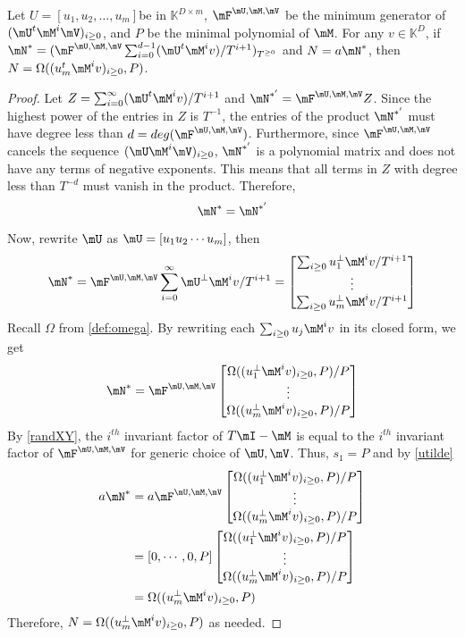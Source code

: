 \documentclass[12pt]{article}
\def\K{\mathbb{K}}
\def\K {\ensuremath{\mathbb{K}}}
\begin{document}
\begin{theorem}
	 Let $U = [u_1,u_2,\dots,u_m]$be in $\K^{D\times m}$,
	 $\mF^{\mU,\mM,\mV}$ be the minimum generator of $(\mU^t \mM^i \mV)_{i\ge0}$,
	 and $P$ be the minimal polynomial of $\mM$. For any 
	 $v \in \K^{D}$, if\\ 
	 $\mN^* = (\mF^{\mU,\mM,\mV}\sum_{i=0}^{d-1} (\mU^t \mM^i v)/T^{i+1})_{T^{\ge0}}$ 
	 and $N = a\mN^*$,
	 then $N = \Omega((u_m^t \mM^i v)_{i\ge0},P)$.
	 \label{theorem:anyv}
\end{theorem}

\begin{proof}
	Let $Z = \sum_{i=0}^{\infty} (\mU^t\mM^iv)/T^{i+1}$ and
	$\mN^{*'} = \mF^{\mU,\mM,\mV} Z$.
	Since the highest power of the entries in 
	$Z$ is $T^{-1}$, the 
	entries of the product $\mN^{*'}$ must have degree less 
	than $d = deg(\mF^{\mU,\mM,\mV})$. Furthermore, since $\mF^{\mU,\mM,\mV}$ cancels 
	the sequence $(\mU\mM^i\mV)_{i \ge 0}$, $\mN^{*'}$ is a
	polynomial matrix and does not have any terms of negative exponents.
	This means that all terms in $Z$ with degree less than $T^{-d}$ must vanish in the
	product.
	Therefore,
	$$ \mN^* = \mN^{*'}$$
	
	Now, rewrite $\mU$ as $\mU = [u_1 u_2 \cdots u_m]$, then
	$$
	\mN^* = \mF^{\mU,\mM,\mV}
	\sum_{i=0}^{\infty} \mU^{\perp} \mM^i v / T^{i+1} =
	\begin{bmatrix}
	\sum_{i\ge 0} u_1^{\perp}\mM^iv/T^{i+1}\\
	\vdots                   \\
	\sum_{i\ge 0} u_m^{\perp}\mM^iv/T^{i+1}
	\end{bmatrix}$$
	Recall $\Omega$ from \cref{def:omega}.
	By rewriting each $\sum_{i\ge0} u_j \mM^i v$ in its closed form, we get
	$$ \mN^* = \mF^{\mU,\mM,\mV}
	\begin{bmatrix}
	\Omega( (u_1^{\perp} \mM^i v)_{i\ge 0},P) / P \\
	\vdots      \\
	\Omega((u_m^{\perp} \mM^i v)_{i\ge 0},P) / P 
	\end{bmatrix}
	$$
	By \cref{randXY}, the $i^{th}$ invariant factor of
	$T\mI - \mM$ is equal to the $i^{th}$ invariant factor of $\mF^{\mU,\mM,\mV}$ 
	for generic choice of
	$\mU,\mV$. Thus, $s_1 = P$ and by \cref{utilde}
	\begin{align*}
	a \mN^* &= a \mF^{\mU,\mM,\mV}
	\begin{bmatrix}
	\Omega((u_1^{\perp} \mM^i v)_{i\ge 0},P) / P \\
	\vdots      \\
	\Omega((u_m^{\perp} \mM^i v)_{i\ge 0},P) / P 
	\end{bmatrix}\\
	&= [0,\cdots,0,P]
	\begin{bmatrix}
	\Omega((u_1^{\perp} \mM^i v)_{i \ge 0},P) / P \\
	\vdots      \\
	\Omega((u_m^{\perp} \mM^i v)_{i\ge 0},P) / P 
	\end{bmatrix}\\
	&= \Omega((u_m^{\perp} \mM^i v)_{i\ge 0},P)
	\end{align*}
	Therefore, $N = \Omega(( u_m^{\perp} \mM^i v)_{i\ge 0},P)$ as needed.
\end{proof}
\end{document}
